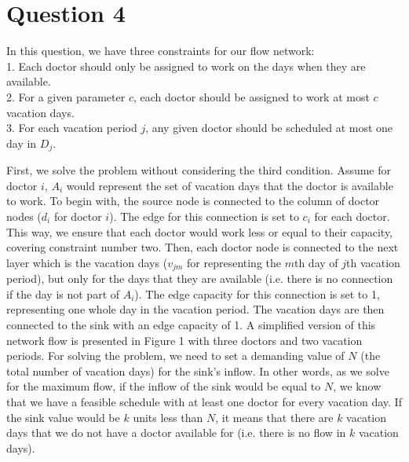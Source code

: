\section{Question 4}

In this question, we have three constraints for our flow network:
\\ 1. Each doctor should only be assigned to work on the days when they are available.
\\ 2. For a given parameter $c$, each doctor should be assigned to work at most $c$ vacation days.
\\ 3. For each vacation period $j$, any given doctor should be scheduled at most one day in $D_j$. 

First, we solve the problem without considering the third condition. Assume for doctor $i$, $A_i$ would represent
the set of vacation days that the doctor is available to work. To begin with, the source node is connected to the column
of doctor nodes ($d_i$ for doctor $i$). The edge for this connection is set to $c_i$ for each doctor. This way, we ensure that each doctor
would work less or equal to their capacity, covering constraint number two. Then, each doctor node is connected to the next layer which is the vacation
days ($v_{jm}$ for representing the $m$th day of $j$th vacation period), but only for the days that they are available (i.e. there is no connection if
the day is not part of $A_i$). The edge capacity for this connection is set to 1, representing one whole day in the vacation period.
The vacation days are then connected to the sink with an edge capacity of 1. A simplified version of this network flow is presented in Figure 1 with three doctors 
and two vacation periods. For solving the problem, we need to set a demanding value of $N$ (the total number of vacation days) for the sink's inflow. In other words, as we solve for the
maximum flow, if the inflow of the sink would be equal to $N$, we know that we have a feasible schedule with at least one doctor for every vacation day. If the sink value would be $k$ units less than $N$, it means
that there are $k$ vacation days that we do not have a doctor available for (i.e. there is no flow in $k$ vacation days). 

